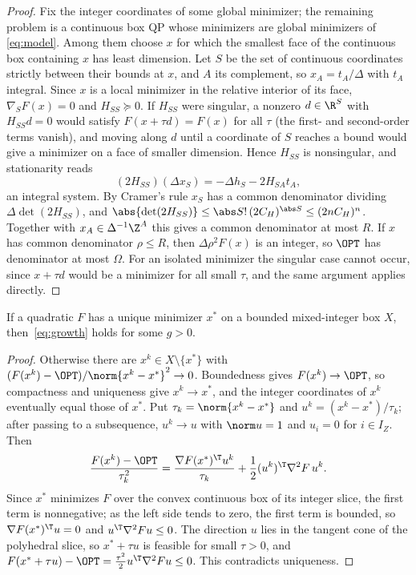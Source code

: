 \begin{proof}
Fix the integer coordinates of some global minimizer; the remaining problem
is a continuous box QP whose minimizers are global minimizers of
\eqref{eq:model}. Among them choose $x$ for which the smallest face of the
continuous box containing $x$ has least dimension. Let $S$ be the set of
continuous coordinates strictly between their bounds at $x$, and $A$ its
complement, so $x_A=t_A/\Delta$ with $t_A$ integral. Since $x$ is a local
minimizer in the relative interior of its face, $\nabla_SF(x)=0$ and
$H_{SS}\succeq0$. If $H_{SS}$ were singular, a nonzero $d\in\R^S$ with
$H_{SS}d=0$ would satisfy $F(x+\tau d)=F(x)$ for all $\tau$ (the first- and
second-order terms vanish), and moving along $d$ until a coordinate of $S$
reaches a bound would give a minimizer on a face of smaller dimension.
Hence $H_{SS}$ is nonsingular, and stationarity reads
\[
(2H_{SS})(\Delta x_S)=-\Delta h_S-2H_{SA}t_A ,
\]
an integral system. By Cramer's rule $x_S$ has a common denominator dividing
$\Delta\det(2H_{SS})$, and
$\abs{\det(2H_{SS})}\le\abs S!\,(2C_H)^{\abs S}\le(2nC_H)^n$. Together with
$x_A\in\Delta^{-1}\Z^A$ this gives a common denominator at most $R$. If $x$
has common denominator $\rho\le R$, then $\Delta\rho^2F(x)$ is an integer,
so $\OPT$ has denominator at most $\Omega$. For an isolated minimizer the
singular case cannot occur, since $x+\tau d$ would be a minimizer for all
small $\tau$, and the same argument applies directly.
\end{proof}

\begin{lemma}\label{lem:unique-growth}
If a quadratic $F$ has a unique minimizer $x^*$ on a bounded mixed-integer
box $X$, then~\eqref{eq:growth} holds for some $g>0$.
\end{lemma}

\begin{proof}
Otherwise there are $x^k\in X\setminus\{x^*\}$ with
$(F(x^k)-\OPT)/\norm{x^k-x^*}^2\to0$. Boundedness gives
$F(x^k)\to\OPT$, so compactness and uniqueness give $x^k\to x^*$, and the
integer coordinates of $x^k$ eventually equal those of $x^*$. Put
$\tau_k=\norm{x^k-x^*}$ and $u^k=(x^k-x^*)/\tau_k$; after passing to a
subsequence, $u^k\to u$ with $\norm u=1$ and $u_i=0$ for $i\in I_Z$. Then
\[
\frac{F(x^k)-\OPT}{\tau_k^2}=\frac{\nabla F(x^*)^\T u^k}{\tau_k}
+\frac12(u^k)^\T\nabla^2F\,u^k .
\]
Since $x^*$ minimizes $F$ over the convex continuous box of its integer
slice, the first term is nonnegative; as the left side tends to zero, the
first term is bounded, so $\nabla F(x^*)^\T u=0$ and
$u^\T\nabla^2Fu\le0$. The direction $u$ lies in the tangent cone of the
polyhedral slice, so $x^*+\tau u$ is feasible for small $\tau>0$, and
$F(x^*+\tau u)-\OPT=\frac{\tau^2}{2}u^\T\nabla^2Fu\le0$. This contradicts
uniqueness.
\end{proof}


